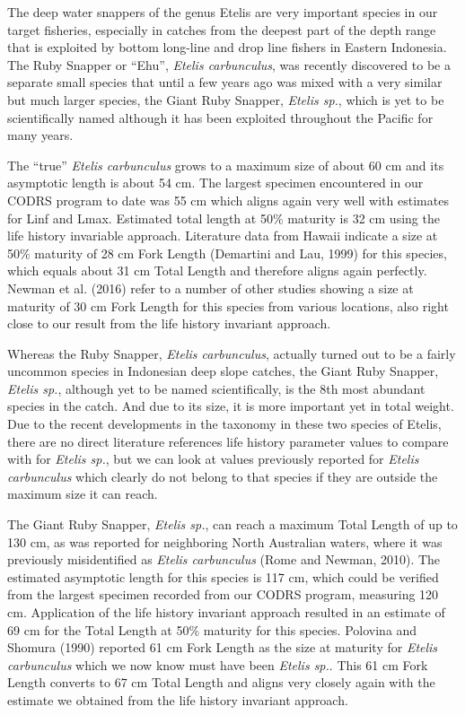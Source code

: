 The deep water snappers of the genus Etelis are very important species in our target fisheries, especially in catches from the deepest part of the depth range that is exploited by bottom long-line and drop line fishers in Eastern Indonesia. The Ruby Snapper or ``Ehu'', \textit{Etelis carbunculus}, was recently discovered to be a separate small species that until a few years ago was mixed with a very similar but much larger species, the Giant Ruby Snapper, \textit{Etelis sp.}, which is yet to be scientifically named although it has been exploited throughout the Pacific for many years.

The ``true'' \textit{Etelis carbunculus} grows to a maximum size of about 60 cm and its asymptotic length is about 54 cm. The largest specimen encountered in our CODRS program to date was 55 cm which aligns again very well with estimates for Linf and Lmax. Estimated total length at 50\% maturity is 32 cm using the life history invariable approach. Literature data from Hawaii indicate a size at 50\% maturity of 28 cm Fork Length (Demartini and Lau, 1999) for this species, which equals about 31 cm Total Length and therefore aligns again perfectly. Newman et al. (2016) refer to a number of other studies showing a size at maturity of 30 cm Fork Length for this species from various locations, also right close to our result from the life history invariant approach.

Whereas the Ruby Snapper, \textit{Etelis carbunculus}, actually turned out to be a fairly uncommon species in Indonesian deep slope catches, the Giant Ruby Snapper, \textit{Etelis sp.}, although yet to be named scientifically, is the 8th most abundant species in the catch. And due to its size, it is more important yet in total weight. Due to the recent developments in the taxonomy in these two species of Etelis, there are no direct literature references life history parameter values to compare with for \textit{Etelis sp.}, but we can look at values previously reported for \textit{Etelis carbunculus} which clearly do not belong to that species if they are outside the maximum size it can reach.

The Giant Ruby Snapper, \textit{Etelis sp.}, can reach a maximum Total Length of up to 130 cm, as was reported for neighboring North Australian waters, where it was previously misidentified as \textit{Etelis carbunculus} (Rome and Newman, 2010). The estimated asymptotic length for this species is 117 cm, which could be verified from the largest specimen recorded from our CODRS program, measuring 120 cm. Application of the life history invariant approach resulted in an estimate of 69 cm for the Total Length at 50\% maturity for this species. Polovina and Shomura (1990) reported 61 cm Fork Length as the size at maturity for \textit{Etelis carbunculus} which we now know must have been \textit{Etelis sp.}. This 61 cm Fork Length converts to 67 cm Total Length and aligns very closely again with the estimate we obtained from the life history invariant approach.

